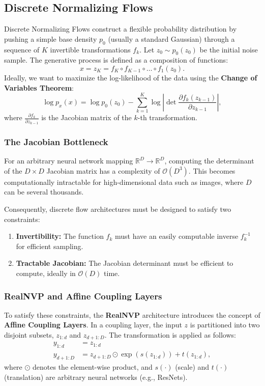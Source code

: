 \documentclass{article}
\begin{document}
\subsection{Discrete Normalizing Flows}

Discrete Normalizing Flows construct a flexible probability distribution by pushing a simple base density $p_0$ (usually a standard Gaussian) through a sequence of $K$ invertible transformations $f_k$. Let $z_0 \sim p_0(z_0)$ be the initial noise sample. The generative process is defined as a composition of functions:
\begin{equation}
    x = z_K = f_K \circ f_{K-1} \circ \dots \circ f_1(z_0).
\end{equation}
Ideally, we want to maximize the log-likelihood of the data using the \textbf{Change of Variables Theorem}:
\begin{equation}
    \log p_x(x) = \log p_0(z_0) - \sum_{k=1}^K \log \left| \det \frac{\partial f_k(z_{k-1})}{\partial z_{k-1}} \right|,
    \label{eq:change_of_vars}
\end{equation}
where $\frac{\partial f_k}{\partial z_{k-1}}$ is the Jacobian matrix of the $k$-th transformation.

\subsubsection{The Jacobian Bottleneck}
For an arbitrary neural network mapping $\mathbb{R}^D \to \mathbb{R}^D$, computing the determinant of the $D \times D$ Jacobian matrix has a complexity of $\mathcal{O}(D^3)$. This becomes computationally intractable for high-dimensional data such as images, where $D$ can be several thousands.

Consequently, discrete flow architectures must be designed to satisfy two constraints:
\begin{enumerate}
    \item \textbf{Invertibility:} The function $f_k$ must have an easily computable inverse $f_k^{-1}$ for efficient sampling.
    \item \textbf{Tractable Jacobian:} The Jacobian determinant must be efficient to compute, ideally in $\mathcal{O}(D)$ time.
\end{enumerate}

\subsubsection{RealNVP and Affine Coupling Layers}
To satisfy these constraints, the \textbf{RealNVP} \cite{dinh2017densityestimationusingreal} architecture introduces the concept of \textbf{Affine Coupling Layers}.
In a coupling layer, the input $z$ is partitioned into two disjoint subsets, $z_{1:d}$ and $z_{d+1:D}$. The transformation is applied as follows:
\begin{align}
    y_{1:d} &= z_{1:d} \\
    y_{d+1:D} &= z_{d+1:D} \odot \exp\left(s(z_{1:d})\right) + t(z_{1:d}),
\end{align}
where $\odot$ denotes the element-wise product, and $s(\cdot)$ (scale) and $t(\cdot)$ (translation) are arbitrary neural networks (e.g., ResNets).
\end{document}
